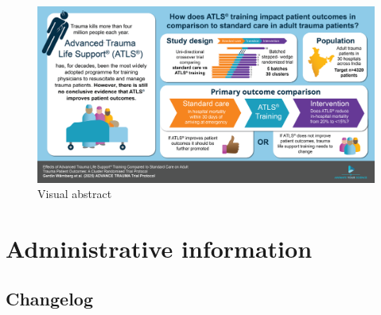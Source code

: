 \documentclass[
]{scrartcl}
\begin{document}
\begin{figure}

{\centering \includegraphics{../shared-assets/visual-abstract-small.png}

}

\caption{Visual abstract}

\end{figure}

\newpage{}

\hypertarget{administrative-information}{%
\section{Administrative information}\label{administrative-information}}

\hypertarget{changelog}{%
\subsection{Changelog}\label{changelog}}
\end{document}
